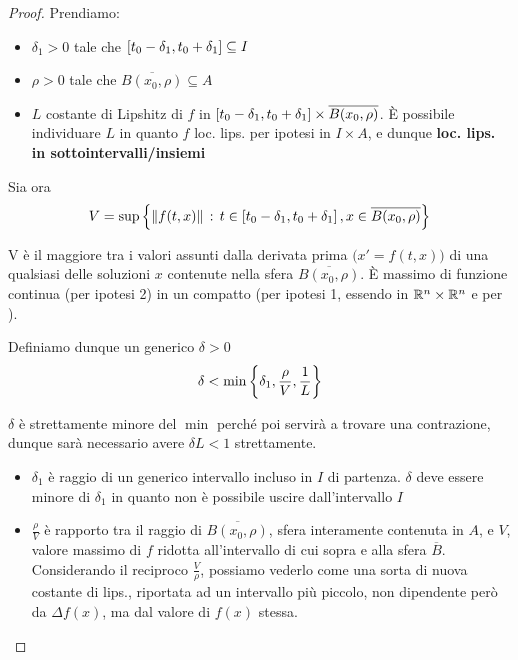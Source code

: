 \begin{theorem}
\begin{proof}
		Prendiamo:
		\begin{itemize}
			\item $\delta_1>0$ tale che $\left[t_0-\delta_1,t_0+\delta_1\right]\subseteq I$
			\item $\rho>0$ tale che $\overline{B(x_0,\rho)}\subseteq A$
			\item $L$ costante di Lipshitz di $f$ in $\left[t_0-\delta_1,t_0+\delta_1\right]\times\overline{B(x_0,\rho)}$. È possibile individuare $L$ in quanto $f$ loc. lips. per ipotesi in $I\times A$, e dunque \textbf{loc. lips. in sottointervalli/insiemi}
		\end{itemize}
		Sia ora
		\[V = \sup\left\{\left\|f(t,x)\right\|\,:\,t\in\left[t_0-\delta_1,t_0+\delta_1\right],x\in\overline{B(x_0,\rho)}\right\}\]
		\vspace*{-\baselineskip}
		\begin{note}
			V è il maggiore tra i valori assunti dalla derivata prima $\bigl(x'=f(t,x)\bigr)$ di una qualsiasi delle soluzioni $x$ contenute nella sfera $\overline{B(x_0,\rho)}$. È massimo di funzione continua (per ipotesi 2) in un compatto (per ipotesi 1, essendo in $\mathbb{R}^n\times\mathbb{R}^n$ e per ).
		\end{note}
		Definiamo dunque un generico $\delta>0$
		\begin{equation}
			\label{eq:cau_delta}
			\delta<\min\left\{\delta_1,\frac{\rho}{V},\frac{1}{L}\right\}
		\end{equation}
		\vspace*{-\baselineskip}
		\begin{note}
			$\delta$ è strettamente minore del $\min$ perché poi servirà a trovare una contrazione, dunque sarà necessario avere $\delta L < 1$ strettamente.
		\end{note}
		\begin{itemize}
			\item $\delta_1$ è raggio di un generico intervallo incluso in $I$ di partenza. $\delta$ deve essere minore di $\delta_1$ in quanto non è possibile uscire dall'intervallo $I$
			\item $\frac{\rho}{V}$ è rapporto tra il raggio di $\overline{B(x_0,\rho)}$, sfera interamente contenuta in $A$, e $V$, valore massimo di $f$ ridotta all'intervallo di cui sopra e alla sfera $\overline{B}$.\\
			Considerando il reciproco $\frac{V}{\rho}$, possiamo vederlo come una sorta di nuova costante di lips., riportata ad un intervallo più piccolo, non dipendente però da $\Delta f(x)$, ma dal valore di $f(x)$ stessa.

\end{itemize}
\end{proof}
\end{theorem}
